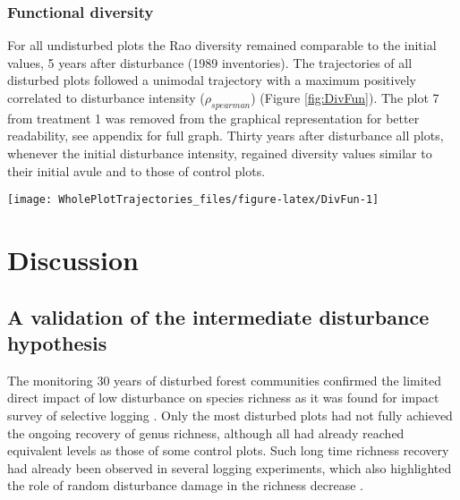 \documentclass[fleqn,10pt]{ArtEcoFoG} %
\theoremstyle{definition}
\theoremstyle{definition}
\theoremstyle{definition}
\theoremstyle{remark}
\begin{document}
\subsubsection{Functional diversity}\label{functional-diversity}

For all undisturbed plots the Rao diversity remained comparable to the
initial values, 5 years after disturbance (1989 inventories). The
trajectories of all disturbed plots followed a unimodal trajectory with
a maximum positively correlated to disturbance intensity
(\(\rho_{spearman}\)) (Figure \ref{fig:DivFun}). The plot 7 from
treatment 1 was removed from the graphical representation for better
readability, see appendix for full graph. Thirty years after disturbance
all plots, whenever the initial disturbance intensity, regained
diversity values similar to their initial avule and to those of control
plots.

\begin{figure*}

{\centering \texttt{[image: WholePlotTrajectories\_files/figure-latex/DivFun-1]} 

}

\caption{Trajectories of the Rao functional diversity over 30 years after disturbance. Trajectories correspond to the median (solid line) and 0.025 and 0.975 percentile (gray envelope) observed after 50 iteration of the taxonomic uncertainty propagation. Initial treatments are represented by solid lines colorswith green for control, blue for T1,orange for T2 and red for T3.and the missing trait value filling processes.}\label{fig:DivFun}
\end{figure*}

\section{Discussion}\label{discussion}

\subsection{A validation of the intermediate disturbance
hypothesis}\label{a-validation-of-the-intermediate-disturbance-hypothesis}

The monitoring 30 years of disturbed forest communities confirmed the
limited direct impact of low disturbance on species richness as it was
found for impact survey of selective logging
\citep{Cannon1998, Baraloto2012a}. Only the most disturbed plots had not
fully achieved the ongoing recovery of genus richness, although all had
already reached equivalent levels as those of some control plots. Such
long time richness recovery had already been observed in several logging
experiments, which also highlighted the role of random disturbance
damage in the richness decrease \citep{DeAvila2015, Hu2018}.
\end{document}
